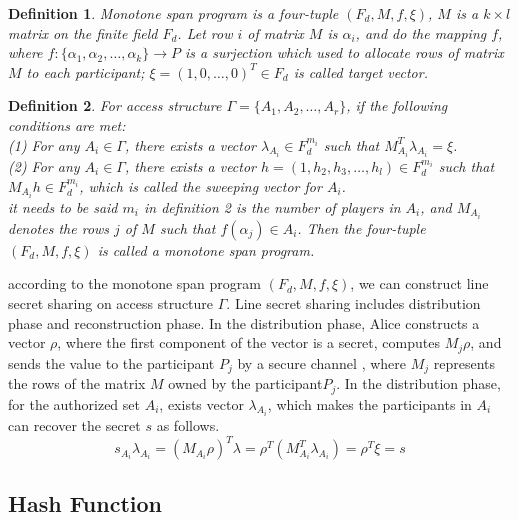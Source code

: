 \documentclass[pdflatex,sn-mathphys]{sn-jnl}%
\theoremstyle{thmstyleone}%
\theoremstyle{thmstyletwo}%
\theoremstyle{thmstylethree}%
\newtheorem{definition}{Definition}%
\begin{document}
\begin{definition}\label{Def1}
Monotone span program is a four-tuple $(F_d,M,f,\xi)$, $M$ is a $k\times l$ matrix on the finite field $F_d$. Let row $i$ of matrix $M$ is $\alpha_i$, and do the mapping $f$, where $f:\lbrace{{\alpha_1},{\alpha_2},\dots,{\alpha_k}}\rbrace\to P$ is a surjection which used to allocate rows of matrix $M$ to each participant; $\xi=(1,0,\dots,0)^T\in F_d$ is called target vector.
\end{definition} 

\begin{definition} \label{Def2}
For access structure $\varGamma=\lbrace{A_1,A_2,\dots,A_r}\rbrace$, if the following conditions are met: \\
(1) For any $A_i\in\varGamma$, there exists a vector $\lambda_{A_i}\in F_d^{m_i} $ such that $M_{A_i}^T\lambda_{A_i}=\xi$. \\
(2) For any $A_i\in \varGamma$, there exists a vector $h=(1,h_2,h_3,\dots,h_l)\in F_d^{m_i}$ such that $M_{A_i}h\in F_d^{m_i}$, which is called the sweeping vector for $A_i$.\\
it needs to be said $m_i$ in definition 2 is the number of players in $A_i$, and $M_{A_i}$ denotes the rows $j$ of $M$ such that $f(\alpha_j)\in A_i$. Then the four-tuple $(F_d,M,f,\xi)$ is called a monotone span program.
\end{definition}
according to the monotone span program $(F_d,M,f,\xi)$, we can construct line secret sharing on access structure $\varGamma$. Line secret sharing includes distribution phase and reconstruction phase. In the distribution phase, Alice constructs a vector $\rho$, where the first component of the vector is a secret, computes $M_j\rho$, and sends the value to the participant $P_j$ by a secure channel \cite{ref-ur32,ref-ur33}, where $M_j$ represents the rows of the matrix $M$ owned by the participant$P_j$. In the distribution phase, for the authorized set $A_i$, exists vector $\lambda_{A_i}$, which makes the participants in $A_i$ can recover the secret $s$ as follows.
\begin{equation}
s_{A_i}\lambda_{A_i}=(M_{A_i}\rho)^T\lambda=\rho^T(M_{A_i}^T\lambda_{A_i})=\rho^T\xi=s
\label{eq4}
\end{equation}

\subsection{Hash Function}\label{subsec3}
\end{document}
